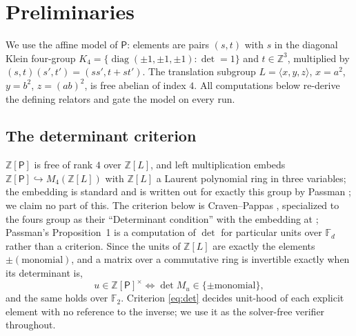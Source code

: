 \documentclass[11pt]{amsart}
\theoremstyle{definition}
\newcommand{\F}{\mathbb{F}}
\newcommand{\Z}{\mathbb{Z}}
\renewcommand{\P}{\mathsf{P}}
\begin{document}
\section{Preliminaries}\label{sec:prelim}

We use the affine model of $\P$: elements are pairs $(s,t)$ with $s$ in the
diagonal Klein four-group $K_4=\{\operatorname{diag}(\pm1,\pm1,\pm1):
\det=1\}$ and $t\in\Z^3$, multiplied by $(s,t)(s',t')=(ss',t+st')$. The
translation subgroup $L=\langle x,y,z\rangle$, $x=a^2$, $y=b^2$, $z=(ab)^2$, is
free abelian of index $4$. All computations below re-derive the defining
relators and gate the model on every run.

\subsection{The determinant criterion}
$\Z[\P]$ is free of rank $4$ over $\Z[L]$, and left multiplication embeds
$\Z[\P]\hookrightarrow M_4(\Z[L])$ with $\Z[L]$ a Laurent polynomial ring in
three variables; the embedding is standard and is written out for exactly this
group by Passman \cite{Passman2021}; we claim no part of this. The criterion
below is Craven--Pappas \cite[Thm.~6.8]{CravenPappas2013}, specialized to the
fours group as their ``Determinant condition'' \cite[Thm.~8.5]{CravenPappas2013}
with the embedding at \cite[Thm.~8.6]{CravenPappas2013}; Passman's Proposition~1
is a computation of $\det$ for particular units over $\F_d$ rather than a
criterion. Since the units of $\Z[L]$ are exactly the elements
$\pm(\text{monomial})$, and a matrix over a commutative ring is invertible
exactly when its determinant is,
\begin{equation}\label{eq:det}
  u\in\Z[\P]^\times \iff \det M_u\in\{\pm\text{monomial}\},
\end{equation}
and the same holds over $\F_2$. Criterion \eqref{eq:det} decides unit-hood of
each explicit element with no reference to the inverse; we use it as the
solver-free verifier throughout.
\end{document}
